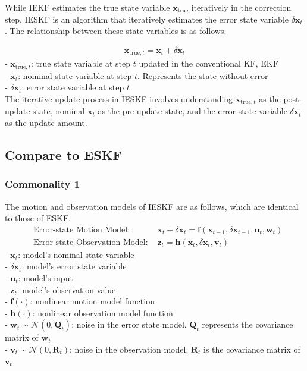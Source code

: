 \documentclass[10pt]{article}
\begin{document}
While IEKF estimates the true state variable $\mathbf{x}_{\text{true}}$ iteratively in the correction step, IESKF is an algorithm that iteratively estimates the error state variable $\delta \mathbf{x}_{t}$. The relationship between these state variables is as follows.

\begin{equation} 
	\begin{aligned}
		\mathbf{x}_{\text{true},t} = \mathbf{x}_{t} + \delta \mathbf{x}_{t}
	\end{aligned}
\end{equation}
- $\mathbf{x}_{\text{true},t}$: true state variable at step $t$ updated in the conventional KF, EKF \\
- $\mathbf{x}_{t}$: nominal state variable at step $t$. Represents the state without error \\
- $\delta \mathbf{x}_{t}$: error state variable at step $t$\\ 

The iterative update process in IESKF involves understanding $\mathbf{x}_{\text{true},t}$ as the post-update state, nominal  $\mathbf{x}_{t}$ as the pre-update state, and the error state variable $\delta \mathbf{x}_{t}$ as the update amount.

\subsection{Compare to ESKF}
\subsubsection{Commonality 1}
The motion and observation models of IESKF are as follows, which are identical to those of ESKF.
\begin{equation}
	\begin{aligned}
		& \text{Error-state Motion Model: } & \mathbf{x}_{t} + \delta \mathbf{x}_{t} = \mathbf{f}(\mathbf{x}_{t-1}, \delta \mathbf{x}_{t-1},\mathbf{u}_{t}, \mathbf{w}_{t})  \\  
		& \text{Error-state Observation Model: } &  \mathbf{z}_{t} = \mathbf{h}(\mathbf{x}_{t}, \delta \mathbf{x}_{t}, \mathbf{v}_{t})
	\end{aligned}
\end{equation}
- $\mathbf{x}_{t}$: model's nominal state variable\\
- $\delta \mathbf{x}_{t}$: model's error state variable\\
- $\mathbf{u}_{t}$: model's input\\
- $\mathbf{z}_{t}$: model's observation value\\
- $\mathbf{f}(\cdot)$: nonlinear motion model function\\
- $\mathbf{h}(\cdot)$: nonlinear observation model function\\
- $\mathbf{w}_{t} \sim \mathcal{N}(0, \mathbf{Q}_{t})$: noise in the error state model. $\mathbf{Q}_{t}$ represents the covariance matrix of $\mathbf{w}_{t}$\\
- $\mathbf{v}_{t} \sim \mathcal{N}(0, \mathbf{R}_{t})$: noise in the observation model. $\mathbf{R}_{t}$ is the covariance matrix of $\mathbf{v}_{t}$\\
\end{document}
